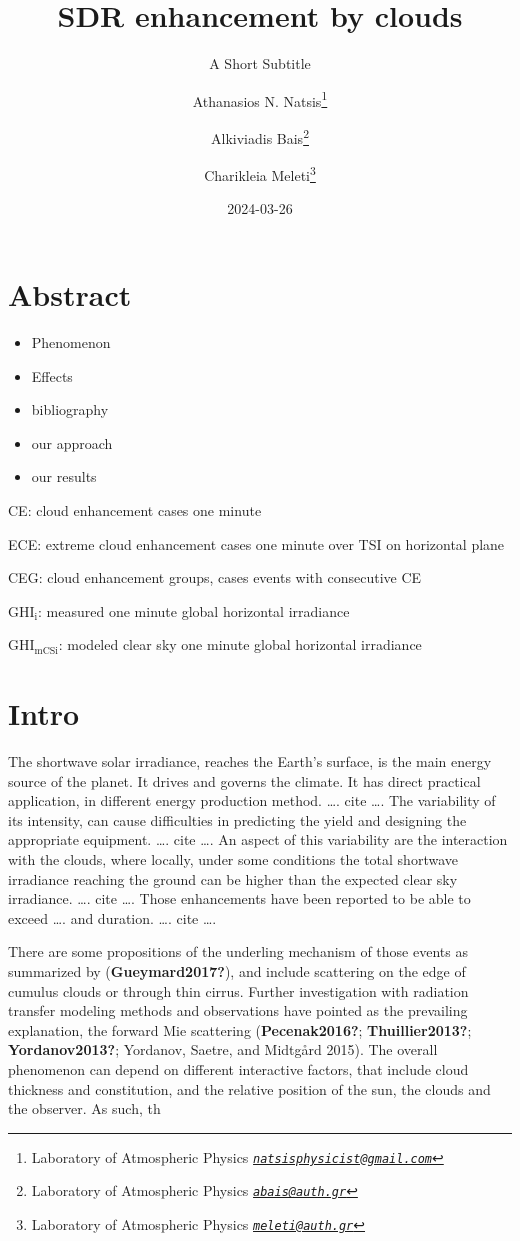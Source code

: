 \documentclass[
]{article}
\title{SDR enhancement by clouds}
\subtitle{A Short Subtitle}
\author{Athanasios N. Natsis\footnote{Laboratory of Atmospheric Physics \emph{\href{mailto:natsisphysicist@gmail.com}{\nolinkurl{natsisphysicist@gmail.com}}}} \and Alkiviadis Bais\footnote{Laboratory of Atmospheric Physics \emph{\href{mailto:abais@auth.gr}{\nolinkurl{abais@auth.gr}}}} \and Charikleia Meleti\footnote{Laboratory of Atmospheric Physics \emph{\href{mailto:meleti@auth.gr}{\nolinkurl{meleti@auth.gr}}}}}
\date{2024-03-26}
\providecommand{\tightlist}{%
  \setlength{\itemsep}{0pt}\setlength{\parskip}{0pt}}
\begin{document}
\maketitle

{
\setcounter{tocdepth}{4}
\tableofcontents
}
\hypertarget{abstract}{%
\section*{Abstract}\label{abstract}}

\begin{itemize}
\tightlist
\item
  Phenomenon
\item
  Effects
\item
  bibliography
\item
  our approach
\item
  our results
\end{itemize}

CE: cloud enhancement cases one minute

ECE: extreme cloud enhancement cases one minute over TSI on horizontal plane

CEG: cloud enhancement groups, cases events with consecutive CE

\(\text{GHI}_\text{i}\): measured one minute global horizontal irradiance

\(\text{GHI}_\text{mCSi}\): modeled clear sky one minute global horizontal irradiance

\hypertarget{intro}{%
\section{Intro}\label{intro}}

The shortwave solar irradiance, reaches the Earth's surface, is the main energy
source of the planet. It drives and governs the climate.
It has direct practical application, in different energy production method.
\ldots. cite \ldots.
The variability of its intensity, can cause difficulties in predicting the yield and
designing the appropriate equipment.
\ldots. cite \ldots.
An aspect of this variability are the interaction with the clouds, where locally, under some
conditions the total shortwave irradiance reaching the ground can be higher than the
expected clear sky irradiance.
\ldots. cite \ldots.
Those enhancements have been reported to be able to exceed \ldots. and duration.
\ldots. cite \ldots.

There are some propositions of the underling mechanism of those events as summarized
by (\textbf{Gueymard2017?}), and include scattering on the edge of cumulus clouds or through
thin cirrus. Further investigation with radiation transfer modeling methods and
observations have pointed as the prevailing explanation, the forward Mie scattering
(\textbf{Pecenak2016?}; \textbf{Thuillier2013?}; \textbf{Yordanov2013?}; Yordanov, Saetre, and Midtgård 2015).
The overall phenomenon can depend on different interactive factors, that include cloud
thickness and constitution, and the relative position of the sun, the clouds and the observer.
As such, th
\end{document}
